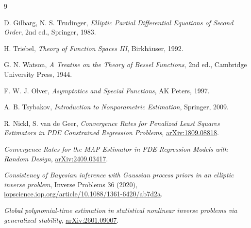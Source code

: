 \documentclass[11pt]{article}
\newcommand{\1}{\mathbf{1}}
\begin{document}
\begin{thebibliography}{9}

 D. Gilbarg, N. S. Trudinger, \emph{Elliptic Partial Differential Equations
of Second Order}, 2nd ed., Springer, 1983.

 H. Triebel, \emph{Theory of Function Spaces III}, Birkh\"auser, 1992.

 G. N. Watson, \emph{A Treatise on the Theory of Bessel Functions},
2nd ed., Cambridge University Press, 1944.

 F. W. J. Olver, \emph{Asymptotics and Special Functions}, AK Peters, 1997.

 A. B. Tsybakov, \emph{Introduction to Nonparametric Estimation},
Springer, 2009.

 R. Nickl, S. van de Geer, \emph{Convergence Rates for Penalized Least
Squares Estimators in PDE Constrained Regression Problems},
\href{https://export.arxiv.org/pdf/1809.08818v3.pdf}{arXiv:1809.08818}.

 \emph{Convergence Rates for the MAP Estimator in PDE-Regression Models
with Random Design}, \href{https://arxiv.org/html/2409.03417}{arXiv:2409.03417}.

 \emph{Consistency of Bayesian inference with Gaussian process priors in
an elliptic inverse problem}, Inverse Problems 36 (2020),
\href{https://google.iopscience.iop.org/article/10.1088/1361-6420/ab7d2a}{iopscience.iop.org/article/10.1088/1361-6420/ab7d2a}.

 \emph{Global polynomial-time estimation in statistical nonlinear inverse
problems via generalized stability},
\href{https://arxiv.org/html/2601.09007}{arXiv:2601.09007}.

\end{thebibliography}
\end{document}
